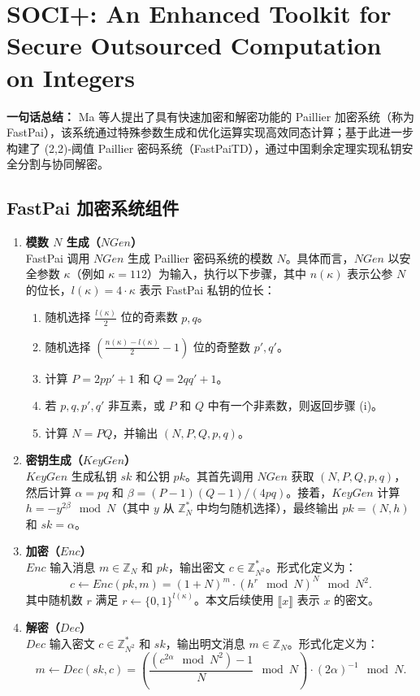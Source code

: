 \clearpage

\section{SOCI+: An Enhanced Toolkit for Secure  Outsourced Computation on Integers}
\textbf{一句话总结：}  
Ma 等人提出了具有快速加密和解密功能的 Paillier 加密系统（称为 FastPai），该系统通过特殊参数生成和优化运算实现高效同态计算；基于此进一步构建了 (2,2)-阈值 Paillier 密码系统（FastPaiTD），通过中国剩余定理实现私钥安全分割与协同解密。

\subsection{FastPai 加密系统组件}
\begin{enumerate}[leftmargin=*, nosep]
    \item \textbf{模数 \(N\) 生成（\(NGen\)）}  \\
    FastPai 调用 \(NGen\) 生成 Paillier 密码系统的模数 \(N\)。具体而言，\(NGen\) 以安全参数 \(\kappa\)（例如 \(\kappa=112\)）为输入，执行以下步骤，其中 \(n(\kappa)\) 表示公参 \(N\) 的位长，\(l(\kappa)=4\cdot\kappa\) 表示 FastPai 私钥的位长：
    \begin{enumerate}[leftmargin=*, nosep]
        \item 随机选择 \(\frac{l(\kappa)}{2}\) 位的奇素数 \(p, q\)。
        \item 随机选择 \((\frac{n(\kappa)-l(\kappa)}{2}-1)\) 位的奇整数 \(p', q'\)。
        \item 计算 \(P = 2pp' + 1\) 和 \(Q = 2qq' + 1\)。
        \item 若 \(p, q, p', q'\) 非互素，或 \(P\) 和 \(Q\) 中有一个非素数，则返回步骤 (i)。
        \item 计算 \(N = PQ\)，并输出 \((N, P, Q, p, q)\)。
    \end{enumerate}

    \item \textbf{密钥生成（\(KeyGen\)）}  \\
    \(KeyGen\) 生成私钥 \(sk\) 和公钥 \(pk\)。其首先调用 \(NGen\) 获取 \((N, P, Q, p, q)\)，然后计算 \(\alpha = pq\) 和 \(\beta = (P-1)(Q-1)/(4pq)\)。接着，\(KeyGen\) 计算 \(h = -y^{2\beta} \mod N\)（其中 \(y\) 从 \(\mathbb{Z}_N^*\) 中均匀随机选择），最终输出 \(pk = (N, h)\) 和 \(sk = \alpha\)。

    \item \textbf{加密（\(Enc\)）}  \\
    \(Enc\) 输入消息 \(m \in \mathbb{Z}_N\) 和 \(pk\)，输出密文 \(c \in \mathbb{Z}_{N^2}^*\)。形式化定义为：
    \[
    c \leftarrow Enc(pk, m) = (1 + N)^m \cdot (h^r \mod N)^N \mod N^2.
    \]
    其中随机数 \(r\) 满足 \(r \leftarrow \{0,1\}^{l(\kappa)}\)。本文后续使用 \(\llbracket x \rrbracket\) 表示 \(x\) 的密文。

    \item \textbf{解密（\(Dec\)）}  \\
    \(Dec\) 输入密文 \(c \in \mathbb{Z}_{N^2}^*\) 和 \(sk\)，输出明文消息 \(m \in \mathbb{Z}_N\)。形式化定义为：
    \[
    m \leftarrow Dec(sk, c) = \left( \frac{(c^{2\alpha} \mod N^2) - 1}{N} \mod N \right) \cdot (2\alpha)^{-1} \mod N.
    \]
\end{enumerate}

